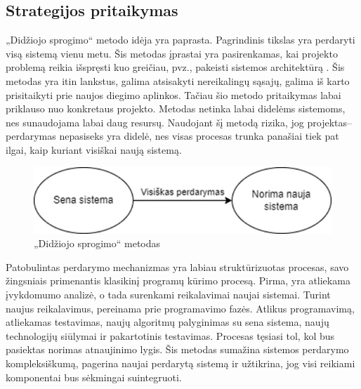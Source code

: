 \documentclass{VUMIFPSbakalaurinis}
\begin{document}
\subsection{Strategijos pritaikymas}
„Didžiojo sprogimo“ metodo idėja yra paprasta. Pagrindinis tikslas yra perdaryti visą sistemą vienu metu. Šis metodas įprastai yra pasirenkamas, kai projekto problemą reikia išspręsti kuo greičiau, pvz., pakeisti sistemos architektūrą \cite{Ngu11}. Šis metodas yra itin lankstus, galima atsisakyti nereikalingų sąsajų, galima iš karto prisitaikyti prie naujos diegimo aplinkos. Tačiau šio metodo pritaikymas labai priklauso nuo konkretaus projekto. Metodas netinka labai didelėms sistemoms, nes sunaudojama labai daug resursų. Naudojant šį metodą rizika, jog projektas–perdarymas nepasiseks yra didelė, nes visas procesas trunka panašiai tiek pat ilgai, kaip kuriant visiškai naują sistemą.
\begin{figure}[H]
    \centering
    \includegraphics{img/didziojo-sprogimo-metodas.png}
    \caption{„Didžiojo sprogimo“ metodas}
    \label{img:didziojo-sprogimo-metodas}
\end{figure}

Patobulintas perdarymo mechanizmas yra labiau struktūrizuotas procesas, savo žingsniais primenantis klasikinį programų kūrimo procesą. Pirma, yra atliekama įvykdomumo analizė, o tada surenkami reikalavimai naujai sistemai. Turint naujus reikalavimus, pereinama prie programavimo fazės. Atlikus programavimą, atliekamas testavimas, naujų algoritmų palyginimas su sena sistema, naujų technologijų siūlymai ir pakartotinis testavimas. Procesas tęsiasi tol, kol bus pasiektas norimas atnaujinimo lygis. Šis metodas sumažina sistemos perdarymo kompleksiškumą, pagerina naujai perdarytą sistemą ir užtikrina, jog visi reikiami komponentai bus sėkmingai suintegruoti.
\end{document}

